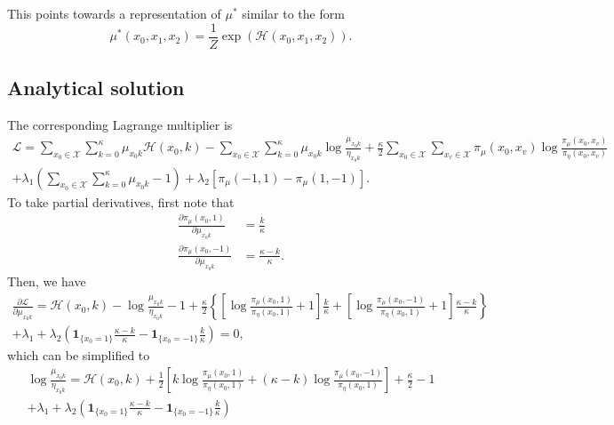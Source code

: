 \documentclass[12pt]{article}
\numberwithin{equation}{section}
\begin{document}
This points towards a representation of $\mu^*$ similar to the form
\begin{equation*}
    \mu^*(x_0, x_1, x_2) = \frac1Z\exp(\mathcal{H}(x_0, x_1, x_2)).
\end{equation*}

\newpage

\subsection{Analytical solution}

The corresponding Lagrange multiplier is
\begin{multline*}
    \mathcal{L} = \sum_{x_0\in\mathcal{X}}\sum_{k=0}^\kappa \mu_{x_0k}\mathcal{H}(x_0, k)
    - \sum_{x_0\in\mathcal{X}}\sum_{k=0}^\kappa \mu_{x_0k}\log\frac{\mu_{x_0k}}{\eta_{x_0k}}
    + \frac{\kappa}{2} \sum_{x_0\in\mathcal{X}}\sum_{x_v\in\mathcal{X}} \pi_\mu(x_0, x_v)\log\frac{\pi_\mu(x_0, x_v)}{\pi_\eta(x_0, x_v)} \\
    + \lambda_1 \left(\sum_{x_0\in\mathcal{X}}\sum_{k=0}^\kappa \mu_{x_0k} - 1\right)
    + \lambda_2 \left[\pi_\mu(-1, 1) - \pi_\mu(1, -1)\right].
\end{multline*}
To take partial derivatives, first note that
\begin{align*}
    \frac{\partial \pi_\mu(x_0, 1)}{\partial \mu_{x_0k}}  & = \frac{k}{\kappa}           \\
    \frac{\partial \pi_\mu(x_0, -1)}{\partial \mu_{x_0k}} & = \frac{\kappa - k}{\kappa}.
\end{align*}
Then, we have
\begin{multline*}
    \frac{\partial \mathcal{L}}{\partial \mu_{x_0k}} = \mathcal{H}(x_0, k)
    - \log\frac{\mu_{x_0k}}{\eta_{x_0k}} - 1
    + \frac{\kappa}{2}\left\{
    \left[\log\frac{\pi_\mu(x_0, 1)}{\pi_\eta(x_0, 1)}+1\right]\frac{k}{\kappa} +
    \left[\log\frac{\pi_\mu(x_0, -1)}{\pi_\eta(x_0, 1)}+1\right]\frac{\kappa - k}{\kappa}
    \right\} \\
    + \lambda_1
    + \lambda_2 \left(\mathbf{1}_{\{x_0=1\}}\frac{\kappa - k}{\kappa} -
    \mathbf{1}_{\{x_0=-1\}}\frac{k}{\kappa}\right) = 0,
\end{multline*}
which can be simplified to
\begin{multline*}
    \log\frac{\mu_{x_0k}}{\eta_{x_0k}} = \mathcal{H}(x_0, k)
    + \frac{1}{2}\left[
        k\log\frac{\pi_\mu(x_0, 1)}{\pi_\eta(x_0, 1)} +
        (\kappa - k)\log\frac{\pi_\mu(x_0, -1)}{\pi_\eta(x_0, 1)}
        \right] + \frac{\kappa}{2} - 1\\
    + \lambda_1
    + \lambda_2 \left(\mathbf{1}_{\{x_0=1\}}\frac{\kappa - k}{\kappa} -
    \mathbf{1}_{\{x_0=-1\}}\frac{k}{\kappa}\right)
\end{multline*}
\end{document}
